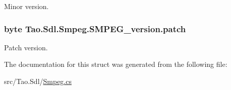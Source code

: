 Minor version. 

\hypertarget{struct_tao_1_1_sdl_1_1_smpeg_1_1_s_m_p_e_g__version_aaf4fc7cf37185274d281630810301b0a}{
\subsubsection[{patch}]{\setlength{\rightskip}{0pt plus 5cm}byte {\bf Tao.Sdl.Smpeg.SMPEG\_\-version.patch}}}
\label{struct_tao_1_1_sdl_1_1_smpeg_1_1_s_m_p_e_g__version_aaf4fc7cf37185274d281630810301b0a}


Patch version. 



The documentation for this struct was generated from the following file:\begin{DoxyCompactItemize}
\item 
src/Tao.Sdl/\hyperlink{_smpeg_8cs}{Smpeg.cs}\end{DoxyCompactItemize}

